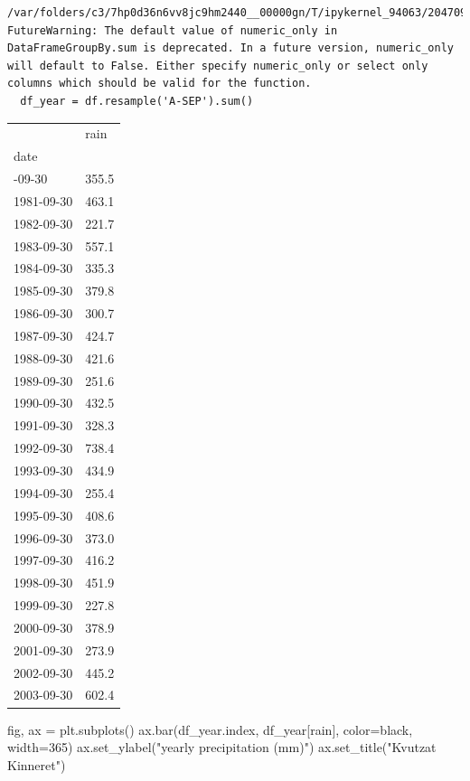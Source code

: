 \documentclass[
  letterpaper,
  DIV=11,
  numbers=noendperiod,
  oneside]{scrreprt}
\newenvironment{Shaded}{\begin{snugshade}}{\end{snugshade}}
\newcommand{\DecValTok}[1]{\textcolor[rgb]{0.68,0.00,0.00}{#1}}
\newcommand{\NormalTok}[1]{\textcolor[rgb]{0.00,0.23,0.31}{#1}}
\newcommand{\OperatorTok}[1]{\textcolor[rgb]{0.37,0.37,0.37}{#1}}
\newcommand{\StringTok}[1]{\textcolor[rgb]{0.13,0.47,0.30}{#1}}
\begin{document}
\begin{verbatim}
/var/folders/c3/7hp0d36n6vv8jc9hm2440__00000gn/T/ipykernel_94063/2047090134.py:1: FutureWarning: The default value of numeric_only in DataFrameGroupBy.sum is deprecated. In a future version, numeric_only will default to False. Either specify numeric_only or select only columns which should be valid for the function.
  df_year = df.resample('A-SEP').sum()
\end{verbatim}

\begin{longtable}[]{@{}ll@{}}
\toprule\noalign{}
& rain \\
date & \\
\midrule\noalign{}
\endhead
\bottomrule\noalign{}
\endlastfoot
1980-09-30 & 355.5 \\
1981-09-30 & 463.1 \\
1982-09-30 & 221.7 \\
1983-09-30 & 557.1 \\
1984-09-30 & 335.3 \\
1985-09-30 & 379.8 \\
1986-09-30 & 300.7 \\
1987-09-30 & 424.7 \\
1988-09-30 & 421.6 \\
1989-09-30 & 251.6 \\
1990-09-30 & 432.5 \\
1991-09-30 & 328.3 \\
1992-09-30 & 738.4 \\
1993-09-30 & 434.9 \\
1994-09-30 & 255.4 \\
1995-09-30 & 408.6 \\
1996-09-30 & 373.0 \\
1997-09-30 & 416.2 \\
1998-09-30 & 451.9 \\
1999-09-30 & 227.8 \\
2000-09-30 & 378.9 \\
2001-09-30 & 273.9 \\
2002-09-30 & 445.2 \\
2003-09-30 & 602.4 \\
\end{longtable}

\begin{Shaded}
\begin{Highlighting}[]
\NormalTok{fig, ax }\OperatorTok{=}\NormalTok{ plt.subplots()}
\NormalTok{ax.bar(df\_year.index, df\_year[}\StringTok{\textquotesingle{}rain\textquotesingle{}}\NormalTok{], color}\OperatorTok{=}\StringTok{\textquotesingle{}black\textquotesingle{}}\NormalTok{,}
\NormalTok{       width}\OperatorTok{=}\DecValTok{365}\NormalTok{)}
\NormalTok{ax.set\_ylabel(}\StringTok{"yearly precipitation (mm)"}\NormalTok{)}
\NormalTok{ax.set\_title(}\StringTok{"Kvutzat Kinneret"}\NormalTok{)}
\end{Highlighting}
\end{Shaded}
\end{document}
